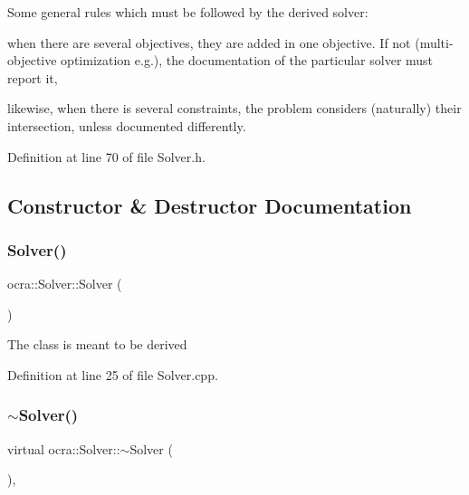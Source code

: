 Some general rules which must be followed by the derived solver\+:
\begin{DoxyItemize}
\item when there are several objectives, they are added in one objective. If not (multi-\/objective optimization e.\+g.), the documentation of the particular solver must report it,
\item likewise, when there is several constraints, the problem considers (naturally) their intersection, unless documented differently. 
\end{DoxyItemize}

Definition at line 70 of file Solver.\+h.



\subsection{Constructor \& Destructor Documentation}
\hypertarget{classocra_1_1Solver_aabd0d52a66f754de1c8f3958ba7faaca}{}\label{classocra_1_1Solver_aabd0d52a66f754de1c8f3958ba7faaca} 
\subsubsection{\texorpdfstring{Solver()}{Solver()}}
{\footnotesize\ttfamily ocra\+::\+Solver\+::\+Solver (\begin{DoxyParamCaption}{ }\end{DoxyParamCaption})\hspace{0.3cm}{\ttfamily [protected]}}

The class is meant to be derived 

Definition at line 25 of file Solver.\+cpp.

\hypertarget{classocra_1_1Solver_a9919a7070eddaaeefda307a0d4bc0aa9}{}\label{classocra_1_1Solver_a9919a7070eddaaeefda307a0d4bc0aa9} 
\subsubsection{\texorpdfstring{$\sim$\+Solver()}{~Solver()}}
{\footnotesize\ttfamily virtual ocra\+::\+Solver\+::$\sim$\+Solver (\begin{DoxyParamCaption}{ }\end{DoxyParamCaption})\hspace{0.3cm}{\ttfamily [inline]}, {\ttfamily [virtual]}}



